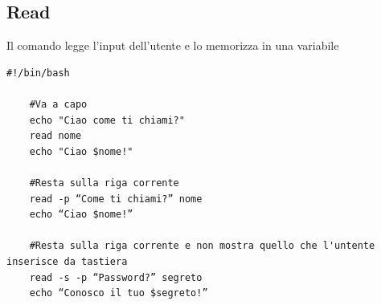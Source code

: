 \documentclass[../main.tex]{subfiles}
\begin{document}
\subsection{Read}
Il comando  legge l'input dell'utente e lo memorizza in una variabile
\begin{lstlisting}[style=bash]
    #!/bin/bash

    #Va a capo
    echo "Ciao come ti chiami?"
    read nome
    echo "Ciao $nome!"

    #Resta sulla riga corrente
    read -p “Come ti chiami?” nome
    echo “Ciao $nome!”

    #Resta sulla riga corrente e non mostra quello che l'untente inserisce da tastiera
    read -s -p “Password?” segreto
    echo “Conosco il tuo $segreto!”
\end{lstlisting}
\end{document}
